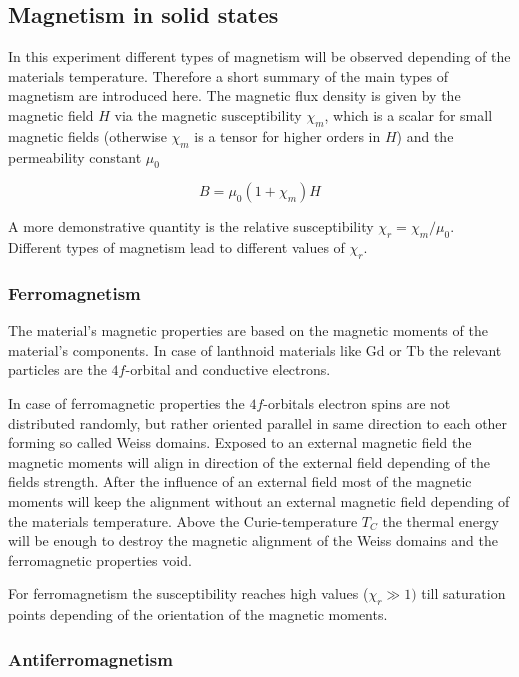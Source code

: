 \documentclass[paper=a4, fontsize=10pt]{scrartcl}
\begin{document}
\newpage

\subsection{Magnetism in solid states}

In this experiment different types of magnetism will be observed
depending of the materials temperature. Therefore a short summary of
the main types of magnetism are introduced here. The magnetic flux
density is given by the magnetic field $H$ via the magnetic
susceptibility $\chi_m$, which is a scalar for small magnetic fields
(otherwise $\chi_m$ is a tensor for higher orders in $H$) and the
permeability constant $\mu_0$

$$B=\mu_0 (1+\chi_m)H$$

A more demonstrative quantity is the relative susceptibility
$\chi_r=\chi_m/\mu_0$. Different types of magnetism lead to different
values of $\chi_r$.


\subsubsection*{Ferromagnetism}


The material's magnetic properties are based on the magnetic moments
of the material's components. In case of lanthnoid materials like Gd
or Tb the relevant particles are the $4f$-orbital and conductive
electrons.

In case of ferromagnetic properties the $4f$-orbitals electron spins
are not distributed randomly, but rather oriented parallel in same
direction to each other forming so called Weiss domains. Exposed to an
external magnetic field the magnetic moments will align in direction
of the external field depending of the fields strength. After the
influence of an external field most of the magnetic moments will keep
the alignment without an external magnetic field depending of the
materials temperature. Above the Curie-temperature $T_C$ the thermal
energy will be enough to destroy the magnetic alignment of the Weiss
domains and the ferromagnetic properties void.

For ferromagnetism the susceptibility reaches high values
($\chi_r\gg1)$ till saturation points depending of the orientation of
the magnetic moments.


\subsubsection*{Antiferromagnetism}
\end{document}

